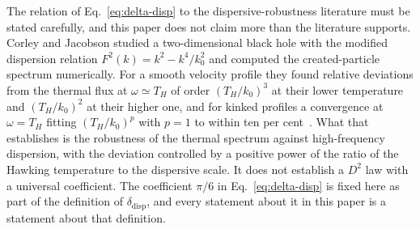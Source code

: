 \documentclass[aps,prd,reprint,nofootinbib,superscriptaddress]{revtex4-2}
\begin{document}
The relation of Eq.~\eqref{eq:delta-disp} to the dispersive-robustness
literature must be stated carefully, and this paper does not claim more
than the literature supports. Corley and Jacobson studied a
two-dimensional black hole with the modified dispersion relation
$F^{2}(k) = k^{2} - k^{4}/k_0^{2}$ and computed the created-particle
spectrum numerically. For a smooth velocity profile they found relative
deviations from the thermal flux at $\omega \simeq T_H$ of order
$(T_H/k_0)^{3}$ at their lower temperature and $(T_H/k_0)^{2}$ at their
higher one, and for kinked profiles a convergence at $\omega = T_H$
fitting $(T_H/k_0)^{p}$ with $p = 1$ to within ten per
cent~\cite{CorleyJacobson1996}. What that establishes is the robustness
of the thermal spectrum against high-frequency dispersion, with the
deviation controlled by a positive power of the ratio of the Hawking
temperature to the dispersive scale. It does not establish a $D^{2}$ law
with a universal coefficient. The coefficient $\pi/6$ in
Eq.~\eqref{eq:delta-disp} is fixed here as part of the definition of
$\delta_{\mathrm{disp}}$, and every statement about it in this paper is a
statement about that definition.
\end{document}
